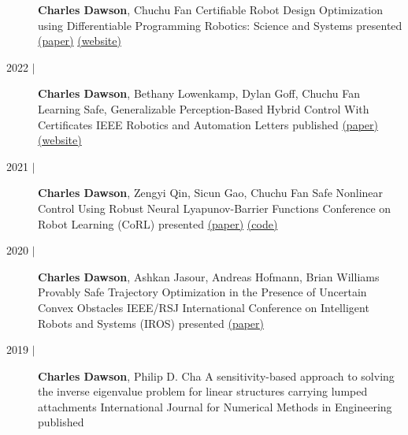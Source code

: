 \documentclass{cv_style}
\newcommand{\me}{\textbf{Charles Dawson}}
\begin{document}
\begin{description}
                    {\me, Chuchu Fan}
                    {Certifiable Robot Design Optimization using Differentiable Programming}
                    {Robotics: Science and Systems}
                    {presented}
                    {
                        \href{http://www.roboticsproceedings.org/rss18/p037.html}{(paper)}
                        \href{https://mit-realm.github.io/architect-rss2022/}{(website)}
                    }
            \item[2022 $\vert$]
                    {\me, Bethany Lowenkamp, Dylan Goff, Chuchu Fan}
                    {Learning Safe, Generalizable Perception-Based Hybrid Control With Certificates}
                    {IEEE Robotics and Automation Letters}
                    {published}
                    {
                        \href{https://ieeexplore.ieee.org/abstract/document/9676477}{(paper)}
                        \href{https://mit-realm.github.io/realm-locus-ral-icra-22/}{(website)}
                    }
            \item[2021 $\vert$]
                    {\me, Zengyi Qin, Sicun Gao, Chuchu Fan}
                    {Safe Nonlinear Control Using Robust Neural Lyapunov-Barrier Functions}
                    {Conference on Robot Learning (CoRL)}
                    {presented}
                    {
                        \href{https://proceedings.mlr.press/v164/dawson22a.html}{(paper)}
                        \href{https://github.com/MIT-REALM/neural_clbf}{(code)}
                    }
            \item[2020 $\vert$]
                    {\me, Ashkan Jasour, Andreas Hofmann, Brian Williams}
                    {Provably Safe Trajectory Optimization in the Presence of Uncertain Convex Obstacles}
                    {IEEE/RSJ International Conference on Intelligent Robots and Systems (IROS)}
                    {presented}
                    {
                        \href{https://ieeexplore.ieee.org/abstract/document/9341193}{(paper)}
                    }
            \item[2019 $\vert$]
                    {\me, Philip D. Cha}
                    {A sensitivity-based approach to solving the inverse eigenvalue problem for linear structures carrying lumped attachments}
                    {International Journal for Numerical Methods in Engineering}
                    {published}
                    {
}
\end{description}
\end{document}
